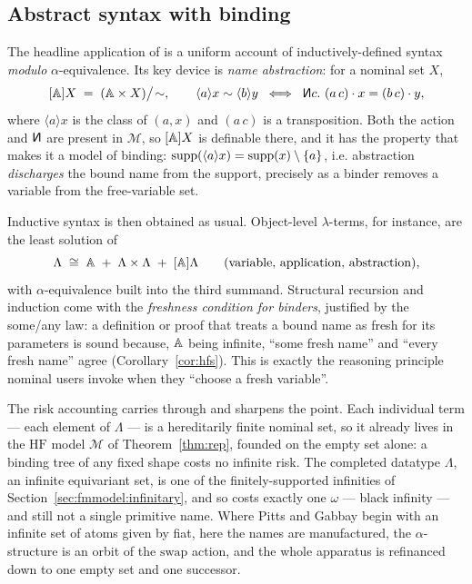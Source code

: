 \subsection{Abstract syntax with binding}
\label{sec:applications:syntax}

The headline application of \cite{DBLP:journals/fac/GabbayP02} is a uniform
account of inductively-defined syntax \emph{modulo} $\alpha$-equivalence. Its key
device is \emph{name abstraction}: for a nominal set $X$,
\[
  [\Atoms]X \;=\; (\Atoms\times X)\big/\!\sim,
  \qquad
  \langle a\rangle x \sim \langle b\rangle y
  \;\;\Longleftrightarrow\;\;
  \new c.\ (a\,c)\cdot x = (b\,c)\cdot y,
\]
where $\langle a\rangle x$ is the class of $(a,x)$ and $(a\,c)$ is a
transposition. Both the action and $\new$ are present in $\mathcal{M}$, so
$[\mathbb{A}]X$ is definable there, and it has the property that makes it a model of
binding: $\mathrm{supp}(\langle a\rangle x) = \mathrm{supp}(x)\setminus\{a\}$, i.e. abstraction
\emph{discharges} the bound name from the support, precisely as a binder removes
a variable from the free-variable set.

Inductive syntax is then obtained as usual. Object-level $\lambda$-terms, for
instance, are the least solution of
\[
  \Lambda \;\cong\; \mathbb{A} \;+\; \Lambda\times\Lambda \;+\; [\mathbb{A}]\Lambda
  \qquad(\text{variable, application, abstraction}),
\]
with $\alpha$-equivalence built into the third summand. Structural recursion and
induction come with the \emph{freshness condition for binders}, justified by the
some/any law: a definition or proof that treats a bound name as fresh for its
parameters is sound because, $\mathbb{A}$ being infinite, ``some fresh name'' and
``every fresh name'' agree (Corollary~\ref{cor:hfs}). This is exactly the
reasoning principle nominal users invoke when they ``choose a fresh variable''.

The risk accounting carries through and sharpens the point. Each individual
term --- each element of $\Lambda$ --- is a hereditarily finite nominal set, so
it already lives in the $\mathrm{HF}$ model $\mathcal{M}$ of
Theorem~\ref{thm:rep}, founded on the empty set alone: a binding tree of any
fixed shape costs no infinite risk. The completed datatype $\Lambda$, an
infinite equivariant set, is one of the finitely-supported infinities of
Section~\ref{sec:fmmodel:infinitary}, and so costs exactly one $\omega$ --- black
infinity --- and still not a single primitive name. Where Pitts and Gabbay begin
with an infinite set of atoms given by fiat, here the names are manufactured, the
$\alpha$-structure is an orbit of the $\mathrm{swap}$ action, and the whole
apparatus is refinanced down to one empty set and one successor.

